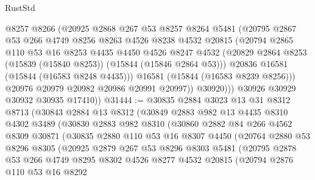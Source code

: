 \begin{lexlean}{RustStd}
\begin{coremodule}
                @8257
                @8266
                (@20925
                  @2868
                  @267
                  @53
                  @8257
                  @8264
                  @5481
                  (@20795
                    @2867
                    @53
                    @266
                    @4749
                    @8256
                    @8263
                    @4526
                    @8238
                    @4532
                    @20815
                    (@20794
                      @2865
                      @110
                      @53
                      @16
                      @8253
                      @4435
                      @4450
                      @4526
                      @8247
                      @4532
                      (@20829 @2864 @8253 (@15839 (@15840 @8253)) (@15844 (@15846 @2864 @53)))
                      @20836
                      @16581
                      (@15844 (@16583 @8248 @4435)))
                    @16581
                    (@15844 (@16583 @8239 @8256)))
                  @20976
                  @20979
                  @20982
                  @20986
                  @20991
                  @20997))
              @30920)))
        @30926
        @30929
        @30932
        @30935
        @17410))
@31444 := @30835
    @2884
    @3023
    @13
    @31
    @8312
    @8713
    (@30843
      @2884
      @13
      @8312
      (@30849
        @2883
        @982
        @13
        @4435
        @8310
        @4302
        @3489
        (@30830
          @2883
          @982
          @8310
          (@30860
            @2882
            @84
            @266
            @4562
            @8309
            @30871
            (@30835
              @2880
              @110
              @53
              @16
              @8307
              @4450
              (@20764
                @2880
                @53
                @8296
                @8305
                (@20925
                  @2879
                  @267
                  @53
                  @8296
                  @8303
                  @5481
                  (@20795
                    @2878
                    @53
                    @266
                    @4749
                    @8295
                    @8302
                    @4526
                    @8277
                    @4532
                    @20815
                    (@20794
                      @2876
                      @110
                      @53
                      @16
                      @8292

\end{coremodule}
\end{lexlean}

